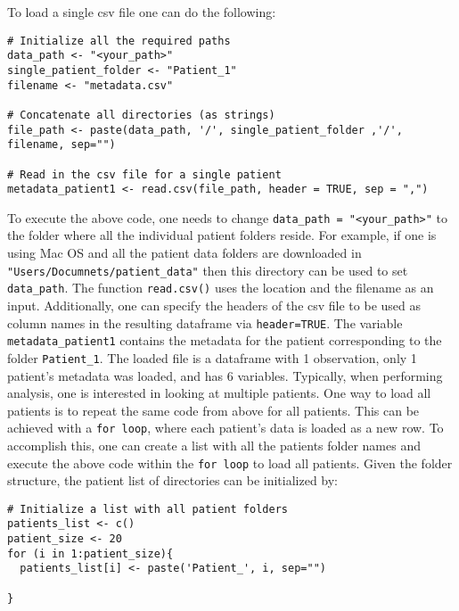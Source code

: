 To load a single csv file one can do the following:
\begin{lstlisting}
# Initialize all the required paths
data_path <- "<your_path>"
single_patient_folder <- "Patient_1"
filename <- "metadata.csv"

# Concatenate all directories (as strings)
file_path <- paste(data_path, '/', single_patient_folder ,'/', filename, sep="")

# Read in the csv file for a single patient
metadata_patient1 <- read.csv(file_path, header = TRUE, sep = ",")
\end{lstlisting}
To execute the above code, one needs to change \verb|data_path = "<your_path>"| to the folder where all the individual patient folders reside. For example, if one is using Mac OS and all the patient data folders are downloaded in \verb|"Users/Documnets/patient_data"| then this directory can be used to set \verb|data_path|.
The function \verb|read.csv()| uses the location and the filename as an input. Additionally, one can specify the headers of the csv file to be used as column names in the resulting dataframe via \verb|header=TRUE|. The variable \verb|metadata_patient1| contains the metadata for the patient corresponding to the folder \verb|Patient_1|. The loaded file is a dataframe with 1 observation, only 1 patient's metadata was loaded, and has 6 variables. Typically, when performing analysis, one is interested in looking at multiple patients. One way to load all patients is to repeat the same code from above for all patients. This can be achieved with a \verb|for loop|, where each patient's data is loaded as a new row. To accomplish this, one can create a list with all the patients folder names and execute the above code within the \verb|for loop| to load all patients. Given the folder structure, the patient list of directories can be initialized by:
\begin{lstlisting}
# Initialize a list with all patient folders
patients_list <- c()
patient_size <- 20
for (i in 1:patient_size){
  patients_list[i] <- paste('Patient_', i, sep="")

}
\end{lstlisting}

